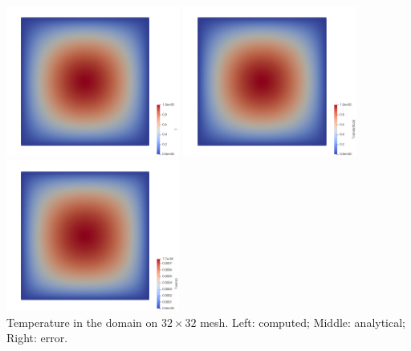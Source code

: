 \begin{center}
\includegraphics[width=5.7cm]{python_codes/fieldstone_173/results/exp2/T}
\includegraphics[width=5.7cm]{python_codes/fieldstone_173/results/exp2/T_analytical}
\includegraphics[width=5.7cm]{python_codes/fieldstone_173/results/exp2/T_error}\\
{\captionfont Temperature in the domain on $32 \times 32$ mesh. 
Left: computed; Middle: analytical; Right: error.}
\end{center}

